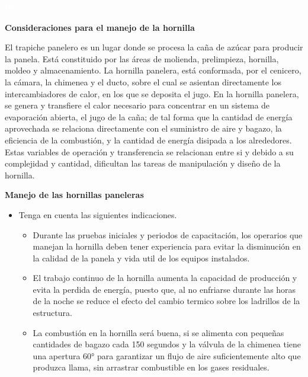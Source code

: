 \documentclass{article}%
\begin{document}
%
\newpage%
\textcolor{white}{ 
HH
}%
\newpage%
\begin{large}%
\begin{Large}%
\textbf{Consideraciones para el manejo de la hornilla}%
\end{Large}%
\newline%
 \newline%
El trapiche panelero es un lugar donde se procesa la caña de azúcar para producir la panela. Está constituido por las áreas de molienda, prelimpieza, hornilla, moldeo y almacenamiento.%
\newline%
 La hornilla panelera, está conformada, por el cenicero, la cámara, la chimenea y el ducto, sobre el cual se asientan directamente los intercambiadores de calor, en los que se deposita el jugo. En la hornilla panelera, se genera y transfiere el calor necesario para concentrar en un sistema de evaporación abierta, el jugo de la caña; de tal forma que la cantidad de energía aprovechada se relaciona directamente con el suministro de aire y bagazo, la eficiencia de la combustión, y la cantidad de energía disipada a los alrededores. Estas variables de operación y transferencia se relacionan entre si y debido a su complejidad y cantidad, dificultan las tareas de manipulación y diseño de la hornilla.%
\begin{Large}%
\textbf{\newline%
 \newline%
 Manejo de las hornillas paneleras}%
\end{Large}%
\begin{itemize}%
\item%
Tenga en cuenta las siguientes indicaciones.%
\begin{itemize}%
\item%
Durante las pruebas iniciales y periodos de capacitación, los operarios que manejan la hornilla deben tener experiencia para evitar la disminución en la calidad de la panela y vida util de los equipos instalados.%
\item%
El trabajo continuo de la hornilla aumenta la capacidad de producción y evita la perdida de energía, puesto que, al no enfriarse durante las horas de la noche se reduce el efecto del cambio termico sobre los ladrillos de la estructura.%
\item%
La combustión en la hornilla será buena, si se alimenta con pequeñas cantidades de bagazo cada 150 segundos y la válvula de la chimenea tiene una apertura 60° para garantizar un flujo de aire suficientemente alto que produzca llama, sin arrastrar combustible en los gases residuales.%

\end{itemize}
\end{itemize}
\end{large}
\end{document}
